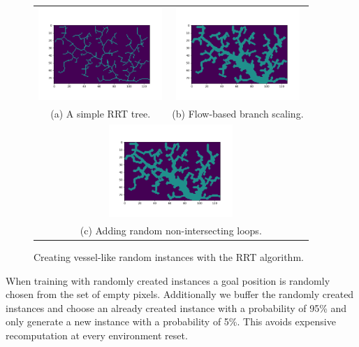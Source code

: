 \begin{figure}[ht]
    \begin{center}
    \begin{tabular}{cc}
    \includegraphics[clip, trim=58 62 45 60, height=3.5cm]{figures/implementation/rrt_base.png} &
    \includegraphics[clip, trim=58 62 45 60, height=3.5cm]{figures/implementation/rrt_base_flow.png} \\
    {\footnotesize (a) A simple RRT tree.} &
    {\footnotesize (b) Flow-based branch scaling.} \\
    \multicolumn{2}{c}{\includegraphics[clip, trim=58 62 45 60, height=3.5cm]{figures/implementation/rrt_base_loops.png}} \\
    \multicolumn{2}{c}{{\footnotesize (c) Adding random non-intersecting loops.}}
    \end{tabular}
    \end{center}
    \caption[Random Instance Generation]{Creating vessel-like random instances with the RRT algorithm.}
    \label{fig:RRRTrees}
  \end{figure}

When training with randomly created instances a goal position is randomly chosen from the set of empty pixels. Additionally we buffer the randomly created instances and choose an already created instance with a probability of 95\% and only generate a new instance with a probability of 5\%. This avoids expensive recomputation at every environment reset.

